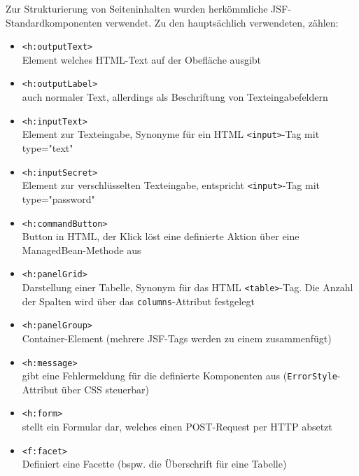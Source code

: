 Zur Strukturierung von Seiteninhalten wurden herkömmliche \ac{JSF}-Standardkomponenten verwendet.
Zu den hauptsächlich verwendeten, zählen:
\begin{itemize}
  \item \texttt{<h:outputText>}\\
    Element welches HTML-Text auf der Obefläche ausgibt 
  
  \item \texttt{<h:outputLabel>}\\
    auch normaler Text, allerdings als Beschriftung von Texteingabefeldern
      
  \item \texttt{<h:inputText>}\\
    Element zur Texteingabe, Synonyme für ein HTML \texttt{<input>}-Tag mit type="text"
  
  \item \texttt{<h:inputSecret>}\\
    Element zur verschlüsselten Texteingabe, entspricht \texttt{<input>}-Tag mit type="password"
  
  \item \texttt{<h:commandButton>}\\
    Button in HTML, der Klick löst eine definierte Aktion über eine ManagedBean-Methode aus

  \item \texttt{<h:panelGrid>}\\
    Darstellung einer Tabelle, Synonym für das HTML \texttt{<table>}-Tag. Die Anzahl der Spalten wird über das \texttt{columns}-Attribut festgelegt
  
  \item \texttt{<h:panelGroup>}\\
    Container-Element (mehrere JSF-Tags werden zu einem zusammenfügt)
  
  \item \texttt{<h:message>}\\
    gibt eine Fehlermeldung für die definierte Komponenten aus (\texttt{ErrorStyle}-Attribut über \ac{CSS} steuerbar)
  
  \item \texttt{<h:form>}\\
    stellt ein Formular dar, welches einen POST-Request per HTTP absetzt
  
  \item \texttt{<f:facet>}\\
    Definiert eine Facette (bspw. die Überschrift für eine Tabelle)
\end{itemize}

